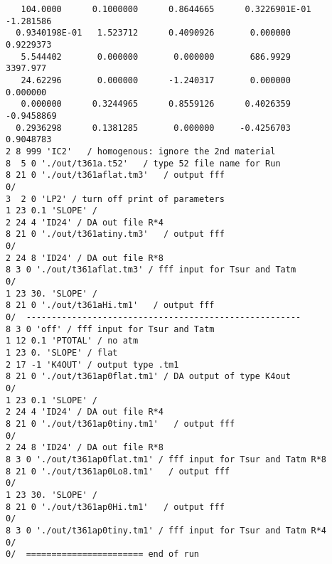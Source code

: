 \documentclass{article}
\begin{document}
\begin{verbatim}
   104.0000      0.1000000      0.8644665      0.3226901E-01  -1.281586    
  0.9340198E-01   1.523712      0.4090926       0.000000      0.9229373    
   5.544402       0.000000       0.000000       686.9929       3397.977    
   24.62296       0.000000      -1.240317       0.000000       0.000000    
   0.000000      0.3244965      0.8559126      0.4026359     -0.9458869    
  0.2936298      0.1381285       0.000000     -0.4256703      0.9048783 
2 8 999 'IC2'   / homogenous: ignore the 2nd material
8  5 0 './out/t361a.t52'   / type 52 file name for Run
8 21 0 './out/t361aflat.tm3'   / output fff
0/ 
3  2 0 'LP2' / turn off print of parameters 
1 23 0.1 'SLOPE' / 
2 24 4 'ID24' / DA out file R*4    
8 21 0 './out/t361atiny.tm3'   / output fff
0/  
2 24 8 'ID24' / DA out file R*8    
8 3 0 './out/t361aflat.tm3' / fff input for Tsur and Tatm
0/ 
1 23 30. 'SLOPE' /   
8 21 0 './out/t361aHi.tm1'   / output fff
0/  ------------------------------------------------------
8 3 0 'off' / fff input for Tsur and Tatm
1 12 0.1 'PTOTAL' / no atm
1 23 0. 'SLOPE' / flat   
2 17 -1 'K4OUT' / output type .tm1  
8 21 0 './out/t361ap0flat.tm1' / DA output of type K4out
0/
1 23 0.1 'SLOPE' / 
2 24 4 'ID24' / DA out file R*4    
8 21 0 './out/t361ap0tiny.tm1'   / output fff 
0/
2 24 8 'ID24' / DA out file R*8    
8 3 0 './out/t361ap0flat.tm1' / fff input for Tsur and Tatm R*8   
8 21 0 './out/t361ap0Lo8.tm1'   / output fff
0/ 
1 23 30. 'SLOPE' /  
8 21 0 './out/t361ap0Hi.tm1'   / output fff
0/ 
8 3 0 './out/t361ap0tiny.tm1' / fff input for Tsur and Tatm R*4
0/ 
0/  ======================= end of run
\end{verbatim}   
\end{document}
